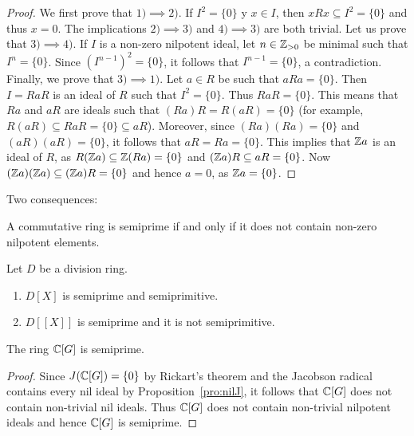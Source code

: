 \begin{proof}
	We first prove that $1)\implies2)$. If $I^2=\{0\}$ y $x\in I$, then
	$xRx\subseteq I^2=\{0\}$ and thus $x=0$. The implications $2)\implies3)$
	and $4)\implies3)$ are both trivial. Let us prove that $3)\implies4)$.  If
	$I$ is a non-zero nilpotent ideal, let $n\in\mathbb{Z}_{>0}$ be minimal such that
	$I^n=\{0\}$.  Since $(I^{n-1})^2=\{0\}$, it follows that $I^{n-1}=\{0\}$, a
	contradiction.  Finally, we prove that $3)\implies1)$. Let $a\in R$ be such
	that $aRa=\{0\}$. Then $I=RaR$ is an ideal of $R$ such that $I^2=\{0\}$. Thus 
	$RaR=\{0\}$. This means that $Ra$ and $aR$ are ideals such that
	$(Ra)R=R(aR)=\{0\}$ (for example, $R(aR)\subseteq RaR=\{0\}\subseteq aR$). 
	Moreover, since $(Ra)(Ra)=\{0\}$ and $(aR)(aR)=\{0\}$, it follows that
	$aR=Ra=\{0\}$. 
	This implies that $\mathbb{Z} a$ is an ideal of $R$, as $R(\mathbb{Z} a)\subseteq \mathbb{Z}(Ra)=\{0\}$ and 
	$(\mathbb{Z} a)R\subseteq aR=\{0\}$. Now $(\mathbb{Z} a)(\mathbb{Z} a)\subseteq (\mathbb{Z} a)R=\{0\}$ and hence
	$a=0$, as $\mathbb{Z} a=\{0\}$. 
\end{proof}

Two consequences:

\begin{exercise}
	A commutative ring is semiprime if and only if it does not contain non-zero
	nilpotent elements. 
\end{exercise}


\begin{exercise}
\label{xca:D_semiprime_semiprimitive}
	Let $D$ be a division ring. 
	\begin{enumerate}
		\item $D[X]$ is semiprime and semiprimitive.
		\item $D[\![X]\!]$ is semiprime and it is not semiprimitive.
	\end{enumerate}
\end{exercise}


\begin{corollary}
\label{cor:C[G]_semiprime}
	The ring $\mathbb{C}[G]$ is semiprime.
\end{corollary}

\begin{proof}
	Since $J(\mathbb{C}[G])=\{0\}$ by Rickart's theorem and the Jacobson radical
	contains every nil ideal by Proposition~\ref{pro:nilJ}, it follows that
	$\mathbb{C}[G]$ does not contain non-trivial nil ideals. Thus $\mathbb{C}[G]$ does not
	contain non-trivial nilpotent ideals and hence $\mathbb{C}[G]$ is semiprime.
\end{proof}

